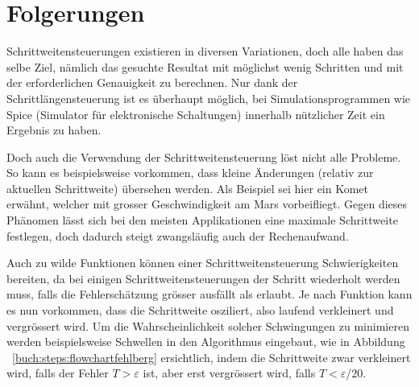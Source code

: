 %
%
%
\section{Folgerungen
\label{steps:section:folgerungen}}
Schrittweitensteuerungen existieren in diversen Variationen, doch alle haben das selbe Ziel, nämlich
das gesuchte Resultat mit möglichst wenig Schritten und mit der erforderlichen Genauigkeit zu berechnen.
Nur dank der Schrittlängensteuerung ist es überhaupt möglich, bei Simulationsprogrammen wie Spice (Simulator für elektronische Schaltungen)
innerhalb nützlicher Zeit ein Ergebnis zu haben.

Doch auch die Verwendung der Schrittweitensteuerung löst nicht alle Probleme.
So kann es beispielsweise vorkommen, dass kleine Änderungen (relativ zur aktuellen Schrittweite) übersehen werden.
Als Beispiel sei hier ein Komet erwähnt, welcher mit grosser Geschwindigkeit am Mars vorbeifliegt.
Gegen dieses Phänomen lässt sich bei den meisten Applikationen eine maximale Schrittweite festlegen,
doch dadurch steigt zwangsläufig auch der Rechenaufwand.

Auch zu wilde Funktionen können einer Schrittweitensteuerung Schwierigkeiten bereiten,
da bei einigen Schrittweitensteuerungen der Schritt wiederholt werden muss,
falls die Fehlerschätzung grösser ausfällt als erlaubt. Je nach Funktion kann es nun vorkommen,
dass die Schrittweite osziliert, also laufend verkleinert und vergrössert wird.
Um die Wahrscheinlichkeit solcher Schwingungen zu minimieren werden beispielsweise Schwellen in den Algorithmus eingebaut,
wie in Abbildung ~\ref{buch:steps:flowchartfehlberg} ersichtlich, indem die Schrittweite zwar verkleinert wird,
falls der Fehler $T > \varepsilon$ ist, aber erst vergrössert wird, falls $T < \varepsilon / 20$.

